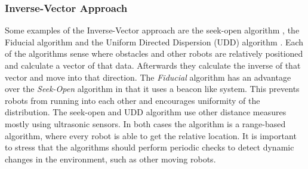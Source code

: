 \subsubsection{Inverse-Vector Approach}
Some examples of the Inverse-Vector approach are the seek-open algorithm \cite{morlok2007dispersing}, the Fiducial algorithm \cite{morlok2007dispersing} and the Uniform Directed Dispersion (UDD) algorithm \cite{mclurkin2007distributed}.
Each of the algorithms sense where obstacles and other robots are relatively positioned and calculate a vector of that data. 
Afterwards they calculate the inverse of that vector and move into that direction.
The \emph{Fiducial} algorithm has an advantage over the \emph{Seek-Open} algorithm in that it uses a beacon like system. 
This prevents robots from running into each other and encourages uniformity of the distribution.
The seek-open and UDD algorithm use other distance measures mostly using ultrasonic sensors. 
In both cases the algorithm is a range-based algorithm, where every robot is able to get the relative location. 
It is important to stress that the algorithms should perform periodic checks to detect dynamic changes in the environment, such as other moving robots.

  \begin{table}[H]
  \renewcommand{\arraystretch}{1.3}
  \label{table_alg_dispersion}
  \centering
{}
  \caption{Overview of Common Dispersion Algorithms}
  \end{table}

